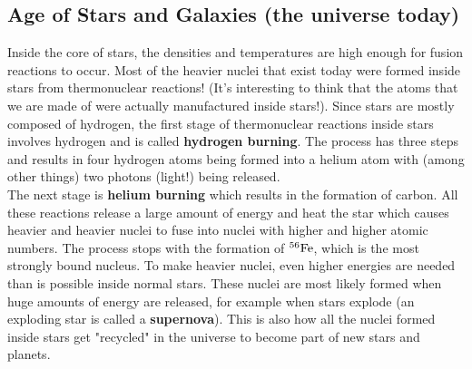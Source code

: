 \subsection{Age of Stars and Galaxies (the universe today)}
Inside the core of stars, the densities and temperatures are high enough for fusion reactions to occur. Most of the heavier nuclei that exist today were formed inside stars from thermonuclear reactions! (It's interesting to think that the atoms that we are made of were actually manufactured inside stars!). Since stars are mostly composed of hydrogen, the first stage of thermonuclear reactions inside stars involves hydrogen and is called \textbf{hydrogen burning}. The process has three steps and results in four hydrogen atoms being formed into a helium atom with (among other things) two photons (light!) being released. \\

The next stage is \textbf{helium burning} which results in the formation of carbon. All these reactions release a large amount of energy and heat the star which causes heavier and heavier nuclei to fuse into nuclei with higher and higher atomic numbers. The process stops with the formation of $^{56}\rm{Fe}$, which is the most strongly bound nucleus. To make heavier nuclei, even higher energies are needed than is possible inside normal stars. These nuclei are most likely formed when huge amounts of energy are released, for example when stars explode (an exploding star is called a \textbf{supernova}). This is also how all the nuclei formed inside stars get "recycled" in the universe to become part of new stars and planets.


